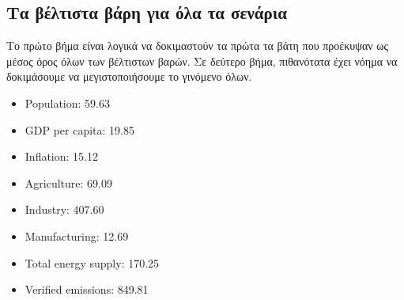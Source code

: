 \documentclass[a4paper,twoside,10pt]{article}
\begin{document}
\subsection{Τα βέλτιστα βάρη για όλα τα σενάρια}
Το πρώτο βήμα είναι λογικά να δοκιμαστούν τα πρώτα τα βάτη που προέκυψαν ως μέσος όρος όλων των βέλτιστων βαρών. Σε δεύτερο βήμα, πιθανότατα έχει νόημα να δοκιμάσουμε να μεγιστοποιήσουμε το γινόμενο όλων. 
	\begin{itemize}
	\item Population: 59.63
	\item GDP per capita: 19.85
	\item Inflation: 15.12
	\item Agriculture: 69.09
	\item Industry: 407.60
	\item Manufacturing: 12.69
	\item Total energy supply: 170.25
	\item Verified emissions: 849.81\\
\end{itemize}
\end{document}
